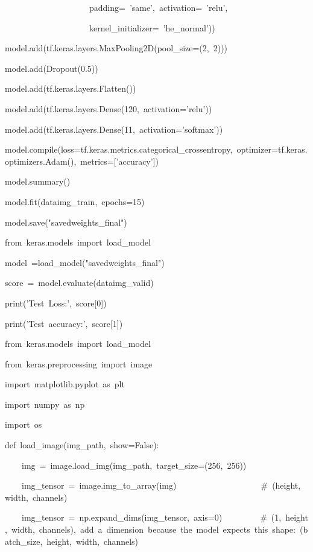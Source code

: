 \documentclass[10pt]{article} %
\begin{document}
\begin{spacing}{1.5}
\noindent ~~~~~~~~~~~~~~~~~~~~padding=~'same',~activation=~'relu',

\noindent ~~~~~~~~~~~~~~~~~~~~kernel\_initializer=~'he\_normal'))

\noindent model.add(tf.keras.layers.MaxPooling2D(pool\_size=(2,~2)))

\noindent model.add(Dropout(0.5))

\noindent model.add(tf.keras.layers.Flatten())

\noindent model.add(tf.keras.layers.Dense(120,~activation='relu'))

\noindent model.add(tf.keras.layers.Dense(11,~activation='softmax'))

\noindent 

\noindent model.compile(loss=tf.keras.metrics.categorical\_crossentropy,~optimizer=tf.keras.optimizers.Adam(),~metrics=['accuracy'])

\noindent model.summary()

\noindent model.fit(dataimg\_train,~epochs=15)

\noindent model.save("savedweights\_final")

\noindent from~keras.models~import~load\_model

\noindent model~=load\_model("savedweights\_final")

\noindent score~=~model.evaluate(dataimg\_valid)

\noindent print('Test~Loss:',~score[0])

\noindent print('Test~accuracy:',~score[1])

\noindent from~keras.models~import~load\_model

\noindent from~keras.preprocessing~import~image

\noindent import~matplotlib.pyplot~as~plt

\noindent import~numpy~as~np

\noindent import~os

\noindent 

\noindent def~load\_image(img\_path,~show=False):

\noindent 

\noindent ~~~~img~=~image.load\_img(img\_path,~target\_size=(256,~256))

\noindent ~~~~img\_tensor~=~image.img\_to\_array(img)~~~~~~~~~~~~~~~~~~~~\#~(height,~width,~channels)

\noindent ~~~~img\_tensor~=~np.expand\_dims(img\_tensor,~axis=0)~~~~~~~~~\#~(1,~height,~width,~channels),~add~a~dimension~because~the~model~expects~this~shape:~(batch\_size,~height,~width,~channels)


\end{spacing}
\end{document}
